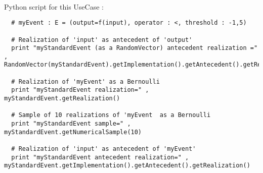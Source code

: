 \textspace\\
Python  script for this UseCase :

\begin{lstlisting}
  # myEvent : E = (output=f(input), operator : <, threshold : -1,5)

  # Realization of 'input' as antecedent of 'output'
  print "myStandardEvent (as a RandomVector) antecedent realization =" , RandomVector(myStandardEvent).getImplementation().getAntecedent().getRealization()

  # Realization of 'myEvent' as a Bernoulli
  print "myStandardEvent realization=" , myStandardEvent.getRealization()

  # Sample of 10 realizations of 'myEvent  as a Bernoulli
  print "myStandardEvent sample=" , myStandardEvent.getNumericalSample(10)

  # Realization of 'input' as antecedent of 'myEvent'
  print "myStandardEvent antecedent realization=" , myStandardEvent.getImplementation().getAntecedent().getRealization()
\end{lstlisting}


